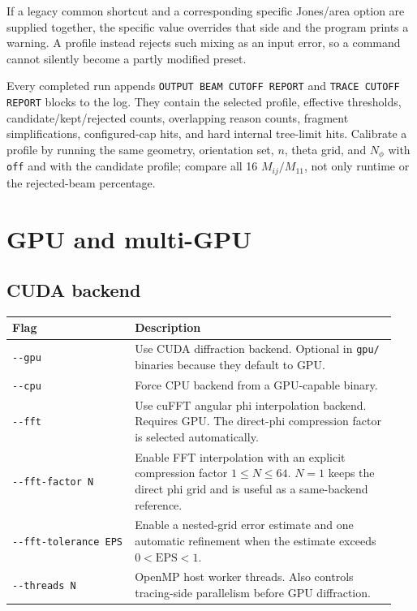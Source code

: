 \documentclass[
  10pt,
  a4paper,
]{article}
\begin{document}
If a legacy common shortcut and a corresponding specific Jones/area option
are supplied together, the specific value overrides that side and the
program prints a warning. A profile instead rejects such mixing as an input
error, so a command cannot silently become a partly modified preset.

Every completed run appends \texttt{OUTPUT BEAM CUTOFF REPORT} and
\texttt{TRACE CUTOFF REPORT} blocks to the log. They contain the selected
profile, effective thresholds, candidate/kept/rejected counts, overlapping
reason counts, fragment simplifications, configured-cap hits, and hard
internal tree-limit hits. Calibrate a profile by running the same geometry,
orientation set, $n$, theta grid, and $N_\phi$ with \texttt{off} and with
the candidate profile; compare all 16 $M_{ij}/M_{11}$, not only runtime or
the rejected-beam percentage.

\section{GPU and multi-GPU}\label{gpu-and-multi-gpu}

\subsection{CUDA backend}\label{cuda-backend}

\begin{longtable}[]{@{}L{0.30\linewidth}L{0.64\linewidth}@{}}
\toprule\noalign{}
Flag & Description \\
\midrule\noalign{}
\endhead
\bottomrule\noalign{}
\endlastfoot
\texttt{-\/-gpu} & Use CUDA diffraction backend. Optional in
\texttt{gpu/} binaries because they default to GPU. \\
\texttt{-\/-cpu} & Force CPU backend from a GPU-capable binary. \\
\texttt{-\/-fft} & Use cuFFT angular phi interpolation backend. Requires
GPU. The direct-phi compression factor is selected automatically. \\
\texttt{-\/-fft-factor N} & Enable FFT interpolation with an explicit
compression factor $1\le N\le64$. $N=1$ keeps the direct phi grid and is
useful as a same-backend reference. \\
\texttt{-\/-fft-tolerance EPS} & Enable a nested-grid error estimate and
one automatic refinement when the estimate exceeds $0<\mathrm{EPS}<1$. \\
\texttt{-\/-threads\ N} & OpenMP host worker threads. Also controls
tracing-side parallelism before GPU diffraction. \\
\end{longtable}
\end{document}
